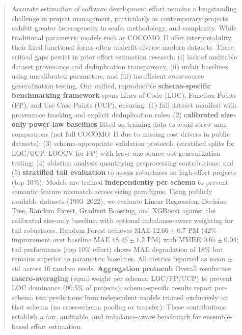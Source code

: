 \documentclass{ieeeaccess}
\begin{document}
\begin{abstract}
Accurate estimation of software development effort remains a longstanding challenge in project management, particularly as contemporary projects exhibit greater heterogeneity in scale, methodology, and complexity. While traditional parametric models such as COCOMO~II offer interpretability, their fixed functional forms often underfit diverse modern datasets. Three critical gaps persist in prior effort estimation research: (i) lack of auditable dataset provenance and deduplication transparency, (ii) unfair baselines using uncalibrated parameters, and (iii) insufficient cross-source generalization testing. Our unified, reproducible \textbf{schema-specific benchmarking framework} spans Lines of Code (LOC), Function Points (FP), and Use Case Points (UCP), ensuring: (1) full dataset manifest with provenance tracking and explicit deduplication rules; (2) \textbf{calibrated size-only power-law baselines} fitted on training data to avoid straw-man comparisons (not full COCOMO~II due to missing cost drivers in public datasets); (3) schema-appropriate validation protocols (stratified splits for LOC/UCP, LOOCV for FP) with leave-one-source-out generalization testing; (4) ablation analysis quantifying preprocessing contributions; and (5) \textbf{stratified tail evaluation} to assess robustness on high-effort projects (top 10\%). Models are trained \textbf{independently per schema} to prevent semantic feature mismatch across sizing paradigms. Using publicly available datasets (1993--2022), we evaluate Linear Regression, Decision Tree, Random Forest, Gradient Boosting, and XGBoost against the calibrated size-only baseline, with optional imbalance-aware weighting for tail robustness. Random Forest achieves MAE $12.66 \pm 0.7$ PM (42\% improvement over baseline MAE $18.45 \pm 1.2$ PM) with MMRE $0.65 \pm 0.04$; tail performance (top 10\% effort) shows MAE degradation of 18\% but remains superior to parametric baselines. All metrics reported as mean $\pm$ std across 10 random seeds. \textbf{Aggregation protocol:} Overall results use \textbf{macro-averaging} (equal weight per schema: LOC/FP/UCP) to prevent LOC dominance (90.5\% of projects); schema-specific results report per-schema test predictions from independent models trained exclusively on that schema (no cross-schema pooling or transfer). These contributions establish a fair, auditable, and imbalance-aware benchmark for ensemble-based effort estimation.
\end{abstract}
\end{document}

